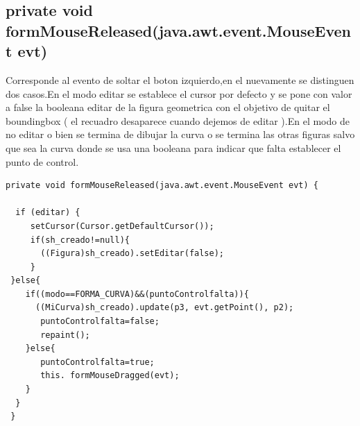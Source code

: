 \subsection*{private void formMouseReleased(java.awt.event.MouseEvent evt)}
Corresponde al evento de soltar el boton izquierdo,en el nuevamente se distinguen dos casos.En el modo editar se establece el cursor por defecto y se pone con valor a false la booleana editar de la figura geometrica con el objetivo de quitar el boundingbox ( el recuadro desaparece cuando dejemos de editar ).En el modo de no editar o bien se termina de dibujar la curva o se termina las otras figuras salvo que sea la curva donde se usa una booleana para indicar que falta establecer el punto de control. 
\begin{lstlisting}
private void formMouseReleased(java.awt.event.MouseEvent evt) {                                   
        
  if (editar) {
     setCursor(Cursor.getDefaultCursor());
     if(sh_creado!=null){
       ((Figura)sh_creado).setEditar(false);
     }         
 }else{
    if((modo==FORMA_CURVA)&&(puntoControlfalta)){
      ((MiCurva)sh_creado).update(p3, evt.getPoint(), p2);
       puntoControlfalta=false;
       repaint();
    }else{  
       puntoControlfalta=true;
       this. formMouseDragged(evt);  
    }
  }
 }      
\end{lstlisting}
